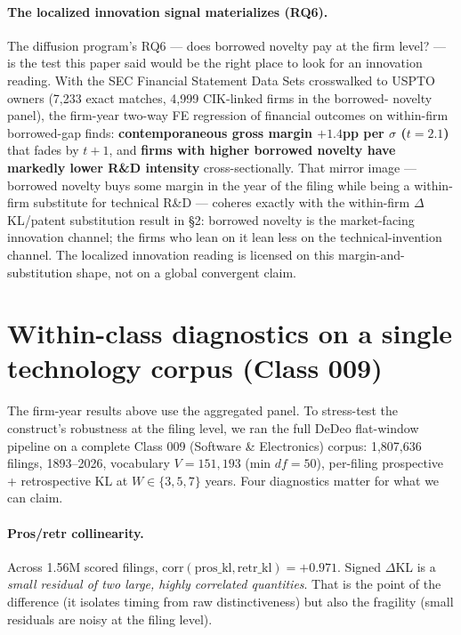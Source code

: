 \documentclass[11pt]{article}
\begin{document}
\paragraph{The localized innovation signal materializes (RQ6).} The diffusion
program's RQ6 --- does borrowed novelty pay at the firm level? --- is the
test this paper said would be the right place to look for an innovation
reading. With the SEC Financial Statement Data Sets crosswalked to USPTO
owners (7{,}233 exact matches, 4{,}999 CIK-linked firms in the borrowed-
novelty panel), the firm-year two-way FE regression of financial outcomes on
within-firm borrowed-gap finds: \textbf{contemporaneous gross margin
$+1.4$pp per $\sigma$ ($t=2.1$)} that fades by $t+1$, and \textbf{firms with
higher borrowed novelty have markedly lower R\&D intensity} cross-sectionally.
That mirror image --- borrowed novelty buys some margin in the year of the
filing while being a within-firm substitute for technical R\&D --- coheres
exactly with the within-firm $\Delta$KL/patent substitution result in §2:
borrowed novelty is the market-facing innovation channel; the firms who lean
on it lean less on the technical-invention channel. The localized innovation
reading is licensed on this margin-and-substitution shape, not on a global
convergent claim.

\section{Within-class diagnostics on a single technology corpus (Class 009)}

The firm-year results above use the aggregated panel. To stress-test the
construct's robustness at the filing level, we ran the full DeDeo flat-window
pipeline on a complete Class 009 (Software \& Electronics) corpus: 1{,}807{,}636
filings, 1893--2026, vocabulary $V = 151{,}193$ (min $df = 50$), per-filing
prospective + retrospective KL at $W \in \{3, 5, 7\}$ years. Four diagnostics
matter for what we can claim.

\paragraph{Pros/retr collinearity.} Across 1.56M scored filings,
$\mathrm{corr}(\mathrm{pros\_kl}, \mathrm{retr\_kl}) = \mathbf{+0.971}$. Signed
$\Delta$KL is a \emph{small residual of two large, highly correlated quantities}.
That is the point of the difference (it isolates timing from raw
distinctiveness) but also the fragility (small residuals are noisy at the
filing level).
\end{document}

